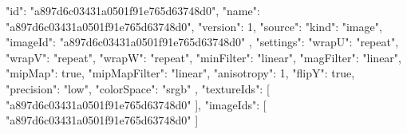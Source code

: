 {
  "id": "a897d6c03431a0501f91e765d63748d0",
  "name": "a897d6c03431a0501f91e765d63748d0",
  "version": 1,
  "source": {
    "kind": "image",
    "imageId": "a897d6c03431a0501f91e765d63748d0"
  },
  "settings": {
    "wrapU": "repeat",
    "wrapV": "repeat",
    "wrapW": "repeat",
    "minFilter": "linear",
    "magFilter": "linear",
    "mipMap": true,
    "mipMapFilter": "linear",
    "anisotropy": 1,
    "flipY": true,
    "precision": "low",
    "colorSpace": "srgb"
  },
  "textureIds": [
    "a897d6c03431a0501f91e765d63748d0"
  ],
  "imageIds": [
    "a897d6c03431a0501f91e765d63748d0"
  ]
}
